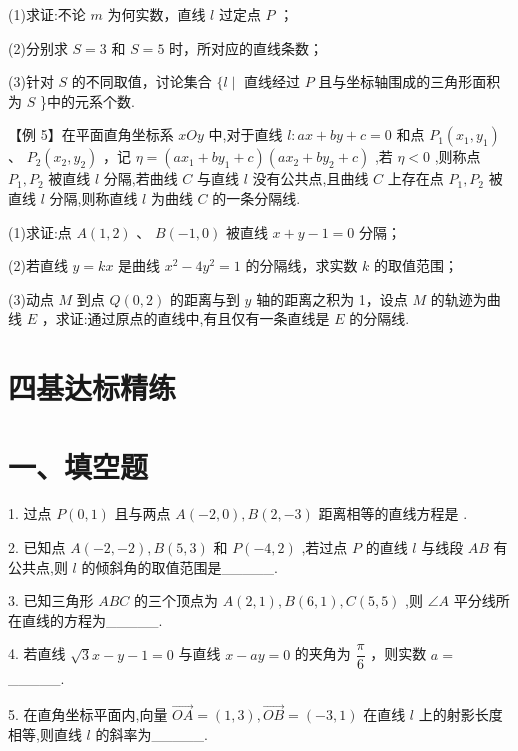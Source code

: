(1)求证:不论 $m$ 为何实数，直线 $l$ 过定点 $P$ ；

(2)分别求 $S = 3$ 和 $S = 5$ 时，所对应的直线条数；

(3)针对 $S$ 的不同取值，讨论集合 $\{ l \mid$ 直线经过 $P$ 且与坐标轴围成的三角形面积为 $S$ \}中的元系个数.

【例 5】在平面直角坐标系 ${xOy}$ 中,对于直线 $l : {ax} + {by} + c = 0$ 和点 ${P}_{1}\left( {{x}_{1},{y}_{1}}\right)$ 、 ${P}_{2}\left( {{x}_{2},{y}_{2}}\right)$ ，记 $\eta  =  \left( {a{x}_{1} + b{y}_{1} + c}\right) \left( {a{x}_{2} + b{y}_{2} + c}\right)$ ,若 $\eta  < 0$ ,则称点 ${P}_{1},{P}_{2}$ 被直线 $l$ 分隔,若曲线 $C$ 与直线 $l$ 没有公共点,且曲线 $C$ 上存在点 ${P}_{1},{P}_{2}$ 被直线 $l$ 分隔,则称直线 $l$ 为曲线 $C$ 的一条分隔线.

(1)求证:点 $A\left( {1,2}\right)$ 、 $B\left( {-1,0}\right)$ 被直线 $x + y - 1 = 0$ 分隔；

(2)若直线 $y = {kx}$ 是曲线 ${x}^{2} - 4{y}^{2} = 1$ 的分隔线，求实数 $k$ 的取值范围；

(3)动点 $M$ 到点 $Q\left( {0,2}\right)$ 的距离与到 $y$ 轴的距离之积为 1，设点 $M$ 的轨迹为曲线 $E$ ，求证:通过原点的直线中,有且仅有一条直线是 $E$ 的分隔线.

\section*{四基达标精练}

\section*{一、填空题}

1. 过点 $P\left( {0,1}\right)$ 且与两点 $A\left( {-2,0}\right) ,B\left( {2, - 3}\right)$ 距离相等的直线方程是 .

2. 已知点 $A\left( {-2, - 2}\right) ,B\left( {5,3}\right)$ 和 $P\left( {-4,2}\right)$ ,若过点 $P$ 的直线 $l$ 与线段 ${AB}$ 有公共点,则 $l$ 的倾斜角的取值范围是\_\_\_\_\_.

3. 已知三角形 ${ABC}$ 的三个顶点为 $A\left( {2,1}\right) ,B\left( {6,1}\right) ,C\left( {5,5}\right)$ ,则 $\angle A$ 平分线所在直线的方程为\_\_\_\_\_.

4. 若直线 $\sqrt{3}x - y - 1 = 0$ 与直线 $x - {ay} = 0$ 的夹角为 $\dfrac{\pi }{6}$ ，则实数 $a =$ \_\_\_\_\_.

5. 在直角坐标平面内,向量 $\overrightarrow{OA} = \left( {1,3}\right) ,\overrightarrow{OB} = \left( {-3,1}\right)$ 在直线 $l$ 上的射影长度相等,则直线 $l$ 的斜率为\_\_\_\_\_.

